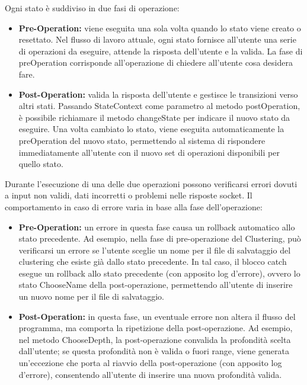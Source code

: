 \begin{enumerate}
    Ogni stato è suddiviso in due fasi di operazione:
    \begin{itemize}
        \item \textbf{Pre-Operation:} viene eseguita una sola volta quando lo stato viene creato o resettato. Nel flusso di lavoro attuale, ogni stato fornisce all'utente una serie di operazioni da eseguire, attende la risposta dell'utente e la valida. La fase di preOperation corrisponde all'operazione di chiedere all'utente cosa desidera fare.
        \item \textbf{Post-Operation:} valida la risposta dell'utente e gestisce le transizioni verso altri stati. Passando StateContext come parametro al metodo postOperation, è possibile richiamare il metodo changeState per indicare il nuovo stato da eseguire. Una volta cambiato lo stato, viene eseguita automaticamente la preOperation del nuovo stato, permettendo al sistema di rispondere immediatamente all'utente con il nuovo set di operazioni disponibili per quello stato.
    \end{itemize}
    
    Durante l'esecuzione di una delle due operazioni possono verificarsi errori dovuti a input non validi, dati incorretti o problemi nelle risposte socket. Il comportamento in caso di errore varia in base alla fase dell'operazione:
    \begin{itemize}
        \item \textbf{Pre-Operation:} un errore in questa fase causa un rollback automatico allo stato precedente. Ad esempio, nella fase di pre-operazione del Clustering, può verificarsi un errore se l'utente sceglie un nome per il file di salvataggio del clustering che esiste già dallo stato precedente. In tal caso, il blocco catch esegue un rollback allo stato precedente (con apposito log d'errore), ovvero lo stato ChooseName della post-operazione, permettendo all'utente di inserire un nuovo nome per il file di salvataggio.
        \item \textbf{Post-Operation:} in questa fase, un eventuale errore non altera il flusso del programma, ma comporta la ripetizione della post-operazione. Ad esempio, nel metodo ChooseDepth, la post-operazione convalida la profondità scelta dall'utente; se questa profondità non è valida o fuori range, viene generata un'eccezione che porta al riavvio della post-operazione (con apposito log d'errore), consentendo all'utente di inserire una nuova profondità valida.
    \end{itemize}
\end{enumerate}


